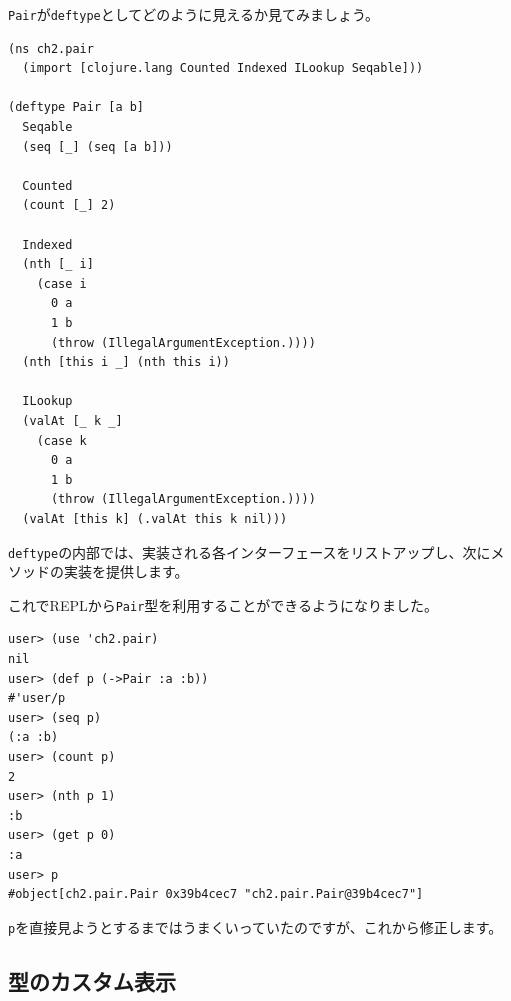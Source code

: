 \texttt{Pair}が\texttt{deftype}としてどのように見えるか見てみましょう。

\begin{lstlisting}[numbers=none]
(ns ch2.pair
  (import [clojure.lang Counted Indexed ILookup Seqable]))

(deftype Pair [a b]
  Seqable
  (seq [_] (seq [a b]))

  Counted
  (count [_] 2)

  Indexed
  (nth [_ i]
    (case i
      0 a
      1 b
      (throw (IllegalArgumentException.))))
  (nth [this i _] (nth this i))

  ILookup
  (valAt [_ k _]
    (case k
      0 a
      1 b
      (throw (IllegalArgumentException.))))
  (valAt [this k] (.valAt this k nil)))
\end{lstlisting}

\texttt{deftype}の内部では、実装される各インターフェースをリストアップし、次にメソッドの実装を提供します。

これでREPLから\texttt{Pair}型を利用することができるようになりました。

\begin{lstlisting}[numbers=none]
user> (use 'ch2.pair)
nil
user> (def p (->Pair :a :b))
#'user/p
user> (seq p)
(:a :b)
user> (count p)
2
user> (nth p 1)
:b
user> (get p 0)
:a
user> p
#object[ch2.pair.Pair 0x39b4cec7 "ch2.pair.Pair@39b4cec7"]
\end{lstlisting}

\texttt{p}を直接見ようとするまではうまくいっていたのですが、これから修正します。

\subsection{型のカスタム表示}










\begin{lstlisting}[numbers=none]

\end{lstlisting}





